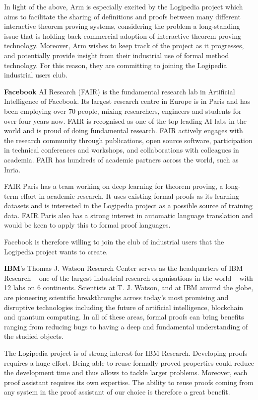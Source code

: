 {In light of the above, Arm is especially excited by the Logipedia
project which aims to facilitate the sharing of definitions and proofs
between many different interactive theorem proving systems,
considering the problem a long-standing issue that is holding back
commercial adoption of interactive theorem proving technology.
Moreover, Arm wishes to keep track of the project as it progresses,
and potentially provide insight from their industrial use of formal
method technology. For this reason, they are committing to joining
the Logipedia industrial users club.


{\bf Facebook} AI Research (FAIR) is the fundamental research lab in
Artificial Intelligence of Facebook. Its largest research centre in
Europe is in Paris and has been employing over 70 people, mixing
researchers, engineers and students for over four years now. FAIR is
recognised as one of the top leading AI labs in the world and is proud
of doing fundamental research. FAIR actively engages with the research
community through publications, open source software, participation in
technical conferences and workshops, and collaborations with
colleagues in academia. FAIR has hundreds of academic partners across
the world, such as Inria.

FAIR Paris has a team working on deep learning for theorem proving, a
long-term effort in academic research. It uses existing formal proofs
as its learning datasets and is interested in the Logipedia project as
a possible source of training data. FAIR Paris also has a strong
interest in automatic language translation and would be keen to apply
this to formal proof languages.

Facebook is therefore willing to join the club of industrial users
that the Logipedia project wants to create.

{\bf IBM}'s Thomas J. Watson Research Center serves as the
headquarters of IBM Research -- one of the largest industrial research
organisations in the world -- with 12 labs on 6 continents. Scientists
at T. J. Watson, and at IBM around the globe, are pioneering
scientific breakthroughs across today's most promising and disruptive
technologies including the future of artificial intelligence, blockchain
and quantum computing. In all of these areas, formal proofs can bring
benefits ranging from reducing bugs to having a deep and fundamental
understanding of the studied objects.

The Logipedia project is of strong interest for IBM
Research. Developing proofs requires a huge effort. Being able to
reuse formally proved properties could reduce the development time and
thus allows to tackle larger problems. Moreover, each proof assistant
requires its own expertise. The ability to reuse proofs coming from
any system in the proof assistant of our choice is therefore a great
benefit.

}
